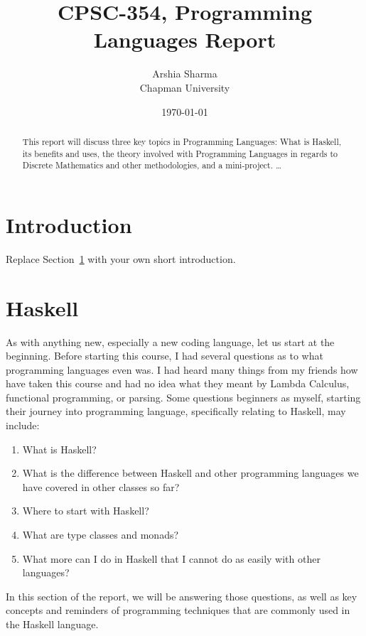 \documentclass{article}
\title{CPSC-354, Programming Languages Report}
\author{Arshia Sharma \\ Chapman University}
\date{\today}
\begin{document}
\maketitle

\begin{abstract}
This report will discuss three key topics in Programming Languages: What is Haskell, its benefits and uses, the theory involved with Programming Languages in regards to Discrete Mathematics and other methodologies, and a mini-project.  \ldots 
\end{abstract}

\tableofcontents

\section{Introduction}\label{intro}

Replace Section~\ref{intro} with your own short introduction. 


\section{Haskell}\label{haskell}

As with anything new, especially a new coding language, let us start at the beginning. Before starting this course, I had several questions as to what programming languages even was. I had heard many things from my friends how have taken this course and had no idea what they meant by Lambda Calculus, functional programming, or parsing. Some questions beginners as myself, starting their journey into programming language, specifically relating to Haskell, may include:
\begin{enumerate}
    \item What is Haskell?
    \item What is the difference between Haskell and other programming languages we have covered in other classes so far?
    \item Where to start with Haskell?
    \item What are type classes and monads?
    \item What more can I do in Haskell that I cannot do as easily with other languages?
    
\end{enumerate}
\noindent
In this section of the report, we will be answering those questions, as well as key concepts and reminders of programming techniques that are commonly used in the Haskell language.
\end{document}
